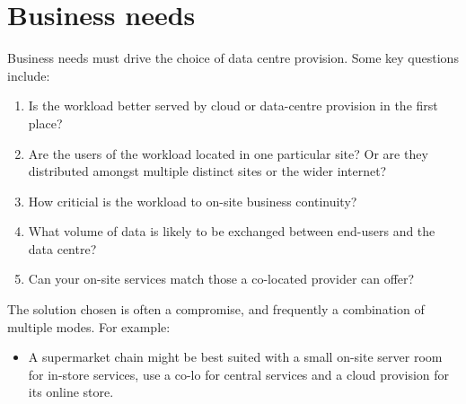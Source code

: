 \section{Business needs}

Business needs must drive the choice of data centre provision.
Some key questions include:
\begin{enumerate}
\item Is the workload better served by cloud or data-centre provision in the first place?
\item Are the users of the workload located in one particular site? Or are they distributed amongst multiple distinct sites or the wider internet? 
\item How criticial is the workload to on-site business continuity?
\item What volume of data is likely to be exchanged between end-users and the data centre?
\item Can your on-site services match those a co-located provider can offer? 
\end{enumerate}
The solution chosen is often a compromise, and frequently a combination of multiple modes. For example:
\begin{itemize}
\item  A supermarket chain might be best suited with a small on-site server room for in-store services, use a co-lo for central services and a cloud provision for its online store.
\end{itemize}



